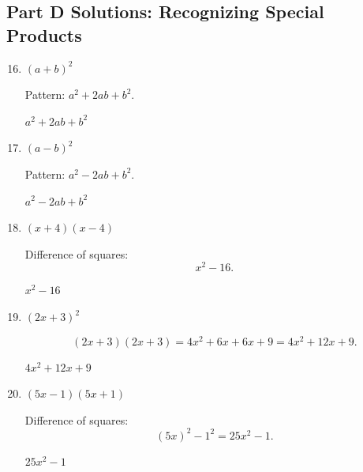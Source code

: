 \documentclass[14pt]{extarticle}
\begin{document}
\subsection*{Part D Solutions: Recognizing Special Products}
\begin{enumerate}
  \setcounter{enumi}{15}
  \item \((a + b)^2\)

  Pattern: \(a^2 + 2ab + b^2.\)

  \(\boxed{a^2 + 2ab + b^2}\)

  \item \((a - b)^2\)

  Pattern: \(a^2 - 2ab + b^2.\)

  \(\boxed{a^2 - 2ab + b^2}\)

  \item \((x + 4)(x - 4)\)

  Difference of squares:
  \[
  x^2 - 16.
  \]

  \(\boxed{x^2 - 16}\)

  \item \((2x + 3)^2\)

  \[
  (2x + 3)(2x + 3)
  = 4x^2 + 6x + 6x + 9
  = 4x^2 + 12x + 9.
  \]

  \(\boxed{4x^2 + 12x + 9}\)

  \item \((5x - 1)(5x + 1)\)

  Difference of squares:
  \[
  (5x)^2 - 1^2 = 25x^2 - 1.
  \]

  \(\boxed{25x^2 - 1}\)
\end{enumerate}
\end{document}

